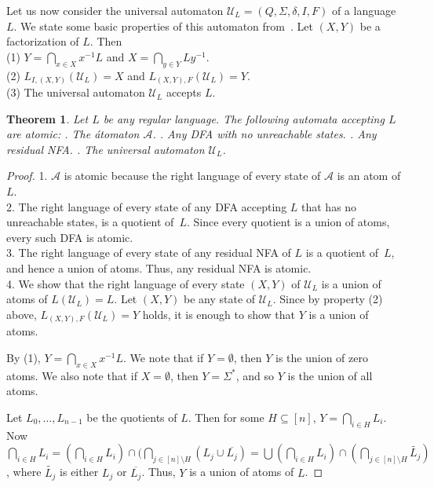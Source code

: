 \documentclass[preprint,12pt]{elsarticle}
\newcommand{\ol}{\overline}
\newcommand{\Sig}{\Sigma}
\newcommand{\cA}{{\mathcal A}}
\newcommand{\cU}{{\mathcal U}}
\newtheorem{theorem}{Theorem}
\begin{document}
Let us now consider the universal automaton $\cU_L=(Q,\Sigma,\delta,I,F)$ of
a language $L$. We state some basic properties of this automaton from~\cite{LoSa07}.
Let $(X,Y)$ be a factorization of $L$.
Then \\
\hglue 10pt (1)
$Y=\bigcap_{x\in X} x^{-1}L$ 
and $X=\bigcap_{y\in Y} Ly^{-1}$.\\
\hglue 10pt (2)
$L_{I,(X,Y)}(\cU_L)=X$ and 
$L_{(X,Y),F}(\cU_L)=Y$.\\
\hglue 10pt (3) The universal automaton $\cU_L$ accepts $L$.


\begin{theorem}
\label{thm:univ_atomic}
Let $L$ be any regular language. The following automata accepting $L$ 
are atomic:
. The \'atomaton $\cA$.
. Any DFA with no unreachable states.
. Any residual NFA. 
. The universal automaton $\cU_L$.
\end{theorem}
\vspace{-.3cm}
\begin{proof} 
1. $\cA$ is atomic because the right language of every state of $\cA$ is an atom of $L$.\\
2. The right language of every state of any DFA accepting $L$ 
that has no unreachable states, 
is a quotient of~$L$. Since every quotient is a union of atoms, every such DFA 
is atomic.\\
3. The right language of every state of any residual NFA of $L$ 
is a quotient of~$L$, and hence a union of atoms. Thus, any residual NFA is 
atomic.\\
4. We show that the right language of every state $(X,Y)$ of $\cU_L$ is a union 
of atoms of $L(\cU_L)=L$. Let $(X,Y)$ be any state of $\cU_L$.
Since by property (2) above, $L_{(X,Y),F}(\cU_L)=Y$ holds, it is enough to show 
that $Y$ is a union of atoms. 

By (1), $Y=\bigcap_{x\in X} x^{-1}L$. 
We note that if $Y=\emptyset$, then $Y$ is the union of zero atoms.
We also note that if $X=\emptyset$, then $Y=\Sig^*$, and so $Y$ is the union of 
all atoms.

Let $L_0,\ldots, L_{n-1}$ be the quotients of $L$. 
Then for some $H\subseteq [n]$, $Y=\bigcap_{i\in H} L_i$.
Now $\bigcap_{i\in H} L_i=(\bigcap_{i\in H} L_i)\cap
(\bigcap_{j\in [n]\setminus H} (L_j\cup\ol{L_j})=
\bigcup (\bigcap_{i\in H} L_i)\cap(\bigcap_{j\in[n]\setminus H}
\widetilde{L_j})$, where $\widetilde{L_j}$ is either $L_j$ or $\ol{L_j}$. 
Thus, $Y$ is a union of atoms of $L$. 
\end{proof}
\end{document}
